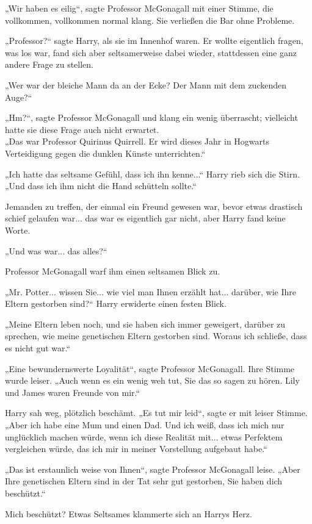 {„Wir haben es eilig“, sagte Professor McGonagall mit einer Stimme, die vollkommen, vollkommen normal klang. Sie verließen die Bar ohne Probleme.

„Professor?“ sagte Harry, als sie im Innenhof waren. Er wollte eigentlich fragen, was los war, fand sich aber seltsamerweise dabei wieder, stattdessen eine ganz andere Frage zu stellen.

„Wer war der bleiche Mann da an der Ecke? Der Mann mit dem zuckenden Auge?“

„Hm?“, sagte Professor McGonagall und klang ein wenig überrascht; vielleicht hatte sie diese Frage auch nicht erwartet.\\ „Das war Professor Quirinus Quirrell. Er wird dieses Jahr in Hogwarts Verteidigung gegen die dunklen Künste unterrichten.“

„Ich hatte das seltsame Gefühl, dass ich ihn kenne...“ Harry rieb sich die Stirn. „Und dass ich ihm nicht die Hand schütteln sollte.“

Jemanden zu treffen, der einmal ein Freund gewesen war, bevor etwas drastisch schief gelaufen war... das war es eigentlich gar nicht, aber Harry fand keine Worte.

„Und was war... das alles?“

Professor McGonagall warf ihm einen seltsamen Blick zu.

„Mr. Potter... wissen Sie... wie viel man Ihnen erzählt hat... darüber, wie Ihre Eltern gestorben sind?“ Harry erwiderte einen festen Blick.

„Meine Eltern leben noch, und sie haben sich immer geweigert, darüber zu sprechen, wie meine genetischen Eltern gestorben sind. Woraus ich schließe, dass es nicht gut war.“

„Eine bewundernswerte Loyalität“, sagte Professor McGonagall. Ihre Stimme wurde leiser. „Auch wenn es ein wenig weh tut, Sie das so sagen zu hören. Lily und James waren Freunde von mir.“

Harry sah weg, plötzlich beschämt. „Es tut mir leid“, sagte er mit leiser Stimme. „Aber ich habe eine Mum und einen Dad. Und ich weiß, dass ich mich nur unglücklich machen würde, wenn ich diese Realität mit... etwas Perfektem vergleichen würde, das ich mir in meiner Vorstellung aufgebaut habe.“

„Das ist erstaunlich weise von Ihnen“, sagte Professor McGonagall leise. „Aber Ihre genetischen Eltern sind in der Tat sehr gut gestorben, Sie haben dich beschützt.“

Mich beschützt? Etwas Seltsames klammerte sich an Harrys Herz.

}
